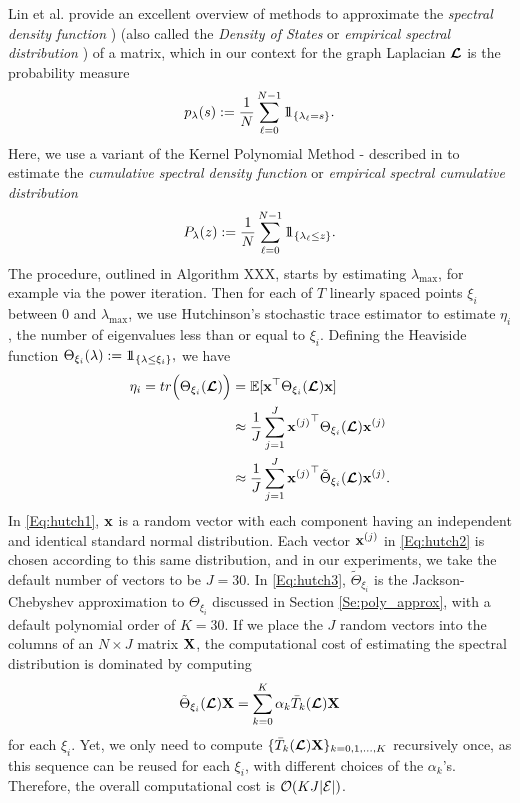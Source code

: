 \documentclass[journal, 10pt]{IEEEtran}
\begin{document}
Lin et al. \cite{lin_spectral_density} provide an excellent overview of methods to approximate the \emph{spectral density function} \cite[Chapter 6]{van_mieghem}) (also called the \emph{Density of States} or \emph{empirical spectral distribution} \cite[Chapter 2.4]{tao_random_matrix}) of a matrix, which in our context for the graph Laplacian $\boldsymbol{\mathcal{L}}$ is the probability measure 
\begin{align*}
p_{\lambda}(s):=\frac{1}{N}\sum_{\ell=0}^{N-1} 1\!\!1_{\left\{\lambda_{\ell}=s\right\}}.
\end{align*}
Here, we use a variant of the Kernel Polynomial Method \cite{silver1994densities}\nocite{silver1996kernel}-\cite{wang1994calculating} described in \cite{lin_spectral_density} to estimate the \emph{cumulative spectral density function} or \emph{empirical spectral cumulative distribution}
\begin{align}
P_{\lambda}(z):=\frac{1}{N}\sum_{\ell=0}^{N-1} 1\!\!1_{\left\{\lambda_{\ell}\leq z\right\}}.
\end{align}
The procedure{\color{red}, outlined in Algorithm  XXX,} starts by estimating $\lambda_{\max}$, for example via the power iteration. Then for each of $T$ linearly spaced points $\xi_i$ between 0 and $\lambda_{\max}$, we use Hutchinson's stochastic trace estimator \cite{hutchinson} to estimate $\eta_i$, the number of eigenvalues less than or equal to $\xi_i$. Defining the Heaviside function $\Theta_{\xi_i}(\lambda):=1\!\!1_{\left\{\lambda \leq \xi_i\right\}},$ we have
\begin{align}
\eta_i =\mbox{tr}\Bigl(\Theta_{\xi_i}(\L)\Bigr) 
&=\mathbb{E}[{\bf x}^{\top}\Theta_{\xi_i}(\L){\bf x}] \label{Eq:hutch1}\\
&\approx \frac{1}{J} \sum_{j=1}^J {{\bf x}^{(j)}}^{\top}\Theta_{\xi_i}(\L){\bf x}^{(j)} \label{Eq:hutch2} \\
&\approx \frac{1}{J} \sum_{j=1}^J {{\bf x}^{(j)}}^{\top}\tilde{\Theta}_{\xi_i}(\L){\bf x}^{(j)}. \label{Eq:hutch3}
\end{align}
In \eqref{Eq:hutch1}, ${\bf x}$ is a random vector with each component having an independent and identical standard normal distribution. Each vector  ${\bf x}^{(j)}$ in \eqref{Eq:hutch2} is chosen according to this same distribution, and in our experiments, we take the default number of vectors to be $J=30$. In \eqref{Eq:hutch3}, $\tilde{\Theta}_{\xi_i}$ is the Jackson-Chebyshev approximation to ${\Theta}_{\xi_i}$ discussed in Section \ref{Se:poly_approx}, with a default polynomial order of $K=30$. If we place the $J$ random vectors into the columns of an $N \times J$ matrix ${\bf X}$, the computational cost of estimating the spectral distribution is dominated by computing 
\begin{align} \label{Eq:hutch4}
\tilde{\Theta}_{\xi_i}(\L){\bf X}=\sum_{k=0}^K \alpha_k \bar{T}_k(\L){\bf X}
\end{align}
 for each $\xi_i$. Yet, %
we only need to compute $\{ \bar{T}_k(\boldsymbol{\mathcal{L}}){\bf X}\}_{k=0,1,\ldots,K}$ recursively once, as this sequence can be reused for each $\xi_i$, with different choices of the $\alpha_k$'s. Therefore, the overall computational cost is ${\cal O}(KJ|\E|)$.
\end{document}
